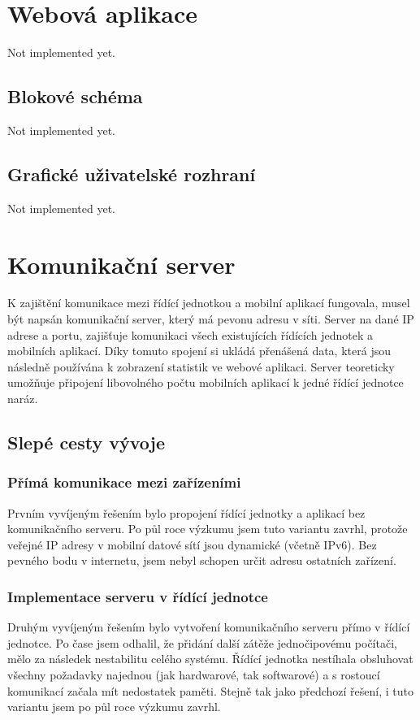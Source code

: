 \documentclass[FM,DP]{tulthesis}  %
\begin{document}

\chapter{Webová aplikace}
Not implemented yet.

\section{Blokové schéma}
Not implemented yet.

\section{Grafické uživatelské rozhraní}
Not implemented yet.


\chapter{Komunikační server}
K zajištění komunikace mezi řídící jednotkou a mobilní aplikací fungovala, musel být napsán komunikační server, který má pevonu adresu v síti. Server na dané IP adrese a portu, zajišťuje komunikaci všech existujících řídících jednotek a mobilních aplikací. Díky tomuto spojení si ukládá přenášená data, která jsou následně používána k zobrazení statistik ve webové aplikaci. Server teoreticky umožňuje připojení libovolného počtu mobilních aplikací k jedné řídící jednotce naráz.

\section{Slepé cesty vývoje}

\subsection{Přímá komunikace mezi zařízeními}
Prvním vyvíjeným řešením bylo propojení řídící jednotky a aplikací bez komunikačního serveru. Po půl roce výzkumu jsem tuto variantu zavrhl, protože veřejné IP adresy v mobilní datové sítí jsou dynamické (včetně IPv6). Bez pevného bodu v internetu, jsem nebyl schopen určit adresu ostatních zařízení.

\subsection{Implementace serveru v řídící jednotce}
Druhým vyvíjeným řešením bylo vytvoření komunikačního serveru přímo v řídící jednotce. Po čase jsem odhalil, že přidání další zátěže jednočipovému počítači, mělo za následek nestabilitu celého systému. Řídící jednotka nestíhala obsluhovat všechny požadavky najednou (jak hardwarové, tak softwarové) a s rostoucí komunikací začala mít nedostatek paměti. Stejně tak jako předchozí řešení, i tuto variantu jsem po půl roce výzkumu zavrhl.
\end{document}
